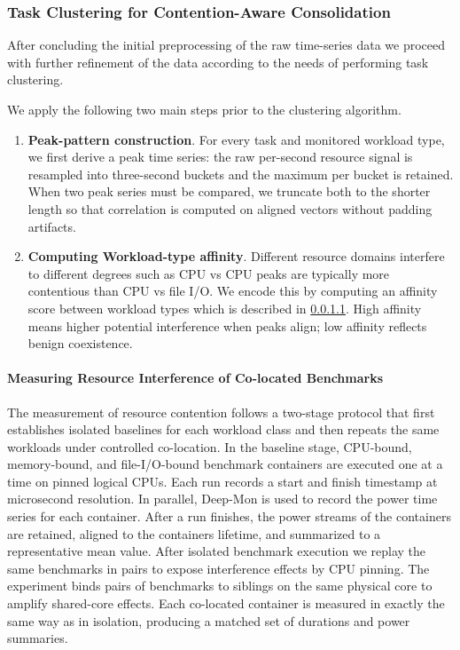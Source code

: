 \subsubsection{Task Clustering for Contention-Aware Consolidation}
\label{sec:task_clustering}

After concluding the initial preprocessing of the raw time-series data we proceed with further refinement of the data according to the needs of performing task clustering.

\label{sec:data_preprocessing_predictive}

We apply the following two main steps prior to the clustering algorithm.

\begin{enumerate}
    \item \textbf{Peak-pattern construction}. For every task and monitored workload type, we first derive a peak time series: the raw per-second resource signal is resampled into three-second buckets and the maximum per bucket is retained. When two peak series must be compared, we truncate both to the shorter length so that correlation is computed on aligned vectors without padding artifacts.
    \item \textbf{Computing Workload-type affinity}. Different resource domains interfere to different degrees such as CPU vs CPU peaks are typically more contentious than CPU vs file I/O. We encode this by computing an affinity score between workload types which is described in \ref{sec:measuring_resource_contention}. High affinity means higher potential interference when peaks align; low affinity reflects benign coexistence.
\end{enumerate}

\paragraph{Measuring Resource Interference of Co-located Benchmarks}
\label{sec:measuring_resource_contention}

The measurement of resource contention follows a two-stage protocol that first establishes isolated baselines for each workload class and then repeats the same workloads under controlled co-location. In the baseline stage, CPU-bound, memory-bound, and file-I/O-bound benchmark containers are executed one at a time on pinned logical CPUs. Each run records a start and finish timestamp at microsecond resolution. In parallel, Deep-Mon is used to record the power time series for each container. After a run finishes, the power streams of the containers are retained, aligned to the containers lifetime, and summarized to a representative mean value.
After isolated benchmark execution we replay the same benchmarks in pairs to expose interference effects by CPU pinning. The experiment binds pairs of benchmarks to siblings on the same physical core to amplify shared-core effects. Each co-located container is measured in exactly the same way as in isolation, producing a matched set of durations and power summaries.

